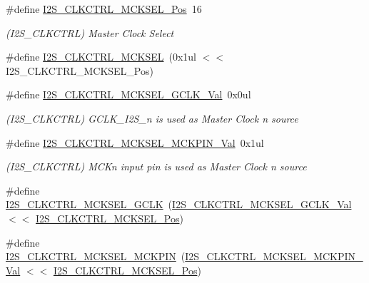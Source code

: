 \begin{DoxyCompactItemize}
\item 
\#define \mbox{\hyperlink{group___s_a_m_d21___i2_s_ga4767c420ba0c4a22f2cfd89f1bd64533}{I2\+S\+\_\+\+C\+L\+K\+C\+T\+R\+L\+\_\+\+M\+C\+K\+S\+E\+L\+\_\+\+Pos}}~16
\begin{DoxyCompactList}\small\item\em (I2\+S\+\_\+\+C\+L\+K\+C\+T\+RL) Master Clock Select \end{DoxyCompactList}\item 
\#define \mbox{\hyperlink{group___s_a_m_d21___i2_s_gac54e73bcbbdf2aa91a0c197b4db65c43}{I2\+S\+\_\+\+C\+L\+K\+C\+T\+R\+L\+\_\+\+M\+C\+K\+S\+EL}}~(0x1ul $<$$<$ I2\+S\+\_\+\+C\+L\+K\+C\+T\+R\+L\+\_\+\+M\+C\+K\+S\+E\+L\+\_\+\+Pos)
\item 
\#define \mbox{\hyperlink{group___s_a_m_d21___i2_s_gad99be42bcb1d8ee04c4f99b4e64612cd}{I2\+S\+\_\+\+C\+L\+K\+C\+T\+R\+L\+\_\+\+M\+C\+K\+S\+E\+L\+\_\+\+G\+C\+L\+K\+\_\+\+Val}}~0x0ul
\begin{DoxyCompactList}\small\item\em (I2\+S\+\_\+\+C\+L\+K\+C\+T\+RL) G\+C\+L\+K\+\_\+\+I2\+S\+\_\+n is used as Master Clock n source \end{DoxyCompactList}\item 
\#define \mbox{\hyperlink{group___s_a_m_d21___i2_s_ga628c7be58d58c99048e2c6fe700924ff}{I2\+S\+\_\+\+C\+L\+K\+C\+T\+R\+L\+\_\+\+M\+C\+K\+S\+E\+L\+\_\+\+M\+C\+K\+P\+I\+N\+\_\+\+Val}}~0x1ul
\begin{DoxyCompactList}\small\item\em (I2\+S\+\_\+\+C\+L\+K\+C\+T\+RL) M\+C\+Kn input pin is used as Master Clock n source \end{DoxyCompactList}\item 
\#define \mbox{\hyperlink{group___s_a_m_d21___i2_s_ga6e280bc84532616d674392928cc5a755}{I2\+S\+\_\+\+C\+L\+K\+C\+T\+R\+L\+\_\+\+M\+C\+K\+S\+E\+L\+\_\+\+G\+C\+LK}}~(\mbox{\hyperlink{group___s_a_m_d21___i2_s_gad99be42bcb1d8ee04c4f99b4e64612cd}{I2\+S\+\_\+\+C\+L\+K\+C\+T\+R\+L\+\_\+\+M\+C\+K\+S\+E\+L\+\_\+\+G\+C\+L\+K\+\_\+\+Val}}   $<$$<$ \mbox{\hyperlink{group___s_a_m_d21___i2_s_ga4767c420ba0c4a22f2cfd89f1bd64533}{I2\+S\+\_\+\+C\+L\+K\+C\+T\+R\+L\+\_\+\+M\+C\+K\+S\+E\+L\+\_\+\+Pos}})
\item 
\#define \mbox{\hyperlink{group___s_a_m_d21___i2_s_gadda1112d528a34e0e924a581a4b568fd}{I2\+S\+\_\+\+C\+L\+K\+C\+T\+R\+L\+\_\+\+M\+C\+K\+S\+E\+L\+\_\+\+M\+C\+K\+P\+IN}}~(\mbox{\hyperlink{group___s_a_m_d21___i2_s_ga628c7be58d58c99048e2c6fe700924ff}{I2\+S\+\_\+\+C\+L\+K\+C\+T\+R\+L\+\_\+\+M\+C\+K\+S\+E\+L\+\_\+\+M\+C\+K\+P\+I\+N\+\_\+\+Val}} $<$$<$ \mbox{\hyperlink{group___s_a_m_d21___i2_s_ga4767c420ba0c4a22f2cfd89f1bd64533}{I2\+S\+\_\+\+C\+L\+K\+C\+T\+R\+L\+\_\+\+M\+C\+K\+S\+E\+L\+\_\+\+Pos}})
$$
\end{DoxyCompactItemize}
